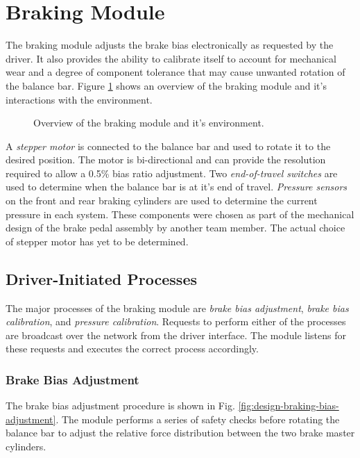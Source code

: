 \section{Braking Module\label{sec:Braking-Module-Design}}

The braking module adjusts the brake bias electronically as requested by the driver. It also provides the ability to calibrate itself to account for mechanical wear and a degree of component tolerance that may cause unwanted rotation of the balance bar. Figure \ref{fig:design_brake_overview_block} shows an overview of the braking module and it's interactions with the environment. 

\vspace{1em}
\begin{figure}[H]
\centering

\caption{Overview of the braking module and it's environment.}
\label{fig:design_brake_overview_block}
\end{figure}

A \emph{stepper motor} is connected to the balance bar and used to rotate it to the desired position. The motor is bi-directional and can provide the resolution required to allow a 0.5\% bias ratio adjustment. Two \emph{end-of-travel switches} are used to determine when the balance bar is at it's end of travel. \emph{Pressure sensors} on the front and rear braking cylinders are used to determine the current pressure in each system. These components were chosen as part of the mechanical design of the brake pedal assembly by another team member. The actual choice of stepper motor has yet to be determined.

\subsection{Driver-Initiated Processes \label{sec:braking_processes}}

The major processes of the braking module are \emph{brake bias adjustment}, \emph{brake bias calibration}, and \emph{pressure calibration}. Requests to perform either of the processes are broadcast over the network from the driver interface. The module listens for these requests and executes the correct process accordingly. 

\subsubsection{Brake Bias Adjustment}

The brake bias adjustment procedure is shown in Fig. \ref{fig:design-braking-bias-adjustment}. The module performs a series of safety checks before rotating the balance bar to adjust the relative force distribution between the two brake master cylinders.

